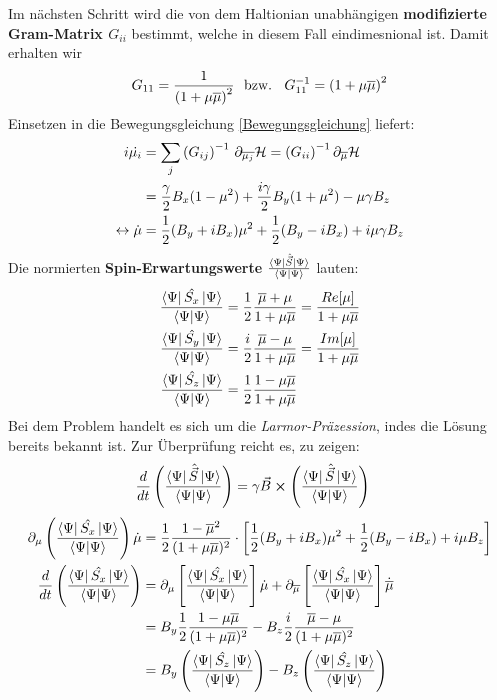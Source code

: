 \noindent Im nächsten Schritt wird die von dem Haltionian unabhängigen \textbf{modifizierte Gram-Matrix $G_{ii}$} bestimmt, 
welche in diesem Fall eindimesnional ist.
Damit erhalten wir
\begin{align}
    G_{11} = \frac{1}{\left(1 + \mu\overline{\mu}\right)^2} \text{\space\space bzw.\space\space } G_{11}^{-1} = \left(1 + \mu\overline{\mu}\right)^2
\end{align}
\noindent Einsetzen in die Bewegungsgleichung \autoref{Bewegungsgleichung} liefert:
\begin{align}
    i\dot{\mu_i} &= \sum_{j}\left(G_{ij}\right)^{-1}\thinspace \partial_{\overline{\mu_j}}\mathcal{H} = \left(G_{ii}\right)^{-1}\partial_{\overline{\mu}} \mathcal{H} \\
    &= \frac{\gamma}{2}B_x(1-\mu^2) + \frac{i\gamma}{2}B_y(1+\mu^2) -\mu \gamma B_z   \label{Larmor} \\ 
    \leftrightarrow \dot{\mu} &= \frac{1}{2}(B_y + iB_x)\mu^2 + \frac{1}{2}(B_y - iB_x) +i\mu \gamma B_z
\end{align}
Die normierten \textbf{Spin-Erwartungswerte} $\frac{\bra{\Psi}\hat{\vec{S}}\ket{\Psi}}{\bra{\Psi}\ket{\Psi}}$ lauten:
\begin{align}
    \frac{\bra{\Psi}\hat{S_x}\ket{\Psi}}{\bra{\Psi}\ket{\Psi}} &= \frac{1}{2}\frac{\overline{\mu} + \mu}{1+\mu\overline{\mu}} = \frac{Re[\mu]}{1 + \mu\overline{\mu}} \\
    \frac{\bra{\Psi}\hat{S_y}\ket{\Psi}}{\bra{\Psi}\ket{\Psi}} &= \frac{i}{2}\frac{\overline{\mu} - \mu}{1+\mu\overline{\mu}} = \frac{Im[\mu]}{1 + \mu\overline{\mu}} \\
    \frac{\bra{\Psi}\hat{S_z}\ket{\Psi}}{\bra{\Psi}\ket{\Psi}} &= \frac{1}{2}\frac{1 - \mu\overline{\mu}}{1 + \mu\overline{\mu}}  
\end{align}
Bei dem Problem handelt es sich um die \textit{Larmor-Präzession}, indes die Lösung bereits bekannt ist. Zur Überprüfung reicht es,
 zu zeigen:
\begin{align}
    \frac{d}{dt}\left(\frac{\bra{\Psi}\hat{\vec{S}}\ket{\Psi}}{\bra{\Psi}\ket{\Psi}}\right) &= \gamma\vec{B} \cross \left(\frac{\bra{\Psi}\hat{\vec{S}}\ket{\Psi}}{\bra{\Psi}\ket{\Psi}}\right)
\end{align}
\begin{align}
    \partial_\mu \left(\frac{\bra{\Psi}\hat{S_x}\ket{\Psi}}{\bra{\Psi}\ket{\Psi}}\right)\dot{\mu} &= \frac{1}{2}\frac{1-\overline{\mu}^2}{(1+\mu\overline{\mu})^2}\cdot\left[\frac{1}{2}(B_y + iB_x)\mu^2 + \frac{1}{2}(B_y - iB_x) +i\mu B_z\right]  \\
    \frac{d}{dt}\left(\frac{\bra{\Psi}\hat{S_x}\ket{\Psi}}{\bra{\Psi}\ket{\Psi}}\right) &= \partial_{\mu}\left[\frac{\bra{\Psi}\hat{S_x}\ket{\Psi}}{\bra{\Psi}\ket{\Psi}}\right]\dot{\mu} + \partial_{\overline{\mu}}\left[\frac{\bra{\Psi}\hat{S_x}\ket{\Psi}}{\bra{\Psi}\ket{\Psi}}\right]\dot{\overline{\mu}}\\
    &= B_y \frac{1}{2}\frac{1-\mu\overline{\mu}}{(1+\mu\overline{\mu})^2} - B_z \frac{i}{2}\frac{\overline{\mu} -\mu}{(1+\mu\overline{\mu})^2}    \\
    &= B_y\left(\frac{\bra{\Psi}\hat{S_z}\ket{\Psi}}{\bra{\Psi}\ket{\Psi}}\right) - B_z\left(\frac{\bra{\Psi}\hat{S_z}\ket{\Psi}}{\bra{\Psi}\ket{\Psi}}\right)
\end{align}
